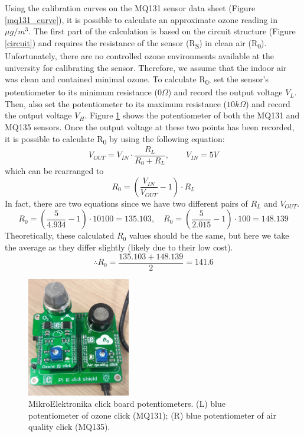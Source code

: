 \documentclass[11pt]{report}
\begin{document}
Using the calibration curves on the MQ131 sensor data sheet (Figure \ref{mq131_curve}), it is possible to calculate an approximate ozone reading in $\mu g/m^3$. The first part of the calculation is based on the circuit structure (Figure \ref{circuit}) and requires the resistance of the sensor (R\textsubscript{S}) in clean air (R\textsubscript{0}). Unfortunately, there are no controlled ozone environments available at the university for calibrating the sensor. Therefore, we assume that the indoor air was clean and contained minimal ozone. To calculate R\textsubscript{0}, set the sensor's potentiometer to its minimum resistance ($0\Omega$) and record the output voltage $V_L$. Then, also set the potentiometer to its maximum resistance ($10k\Omega$) and record the output voltage $V_H$. Figure \ref{potentiometer} shows the potentiometer of both the MQ131 and MQ135 sensors. Once the output voltage at these two points has been recorded, it is possible to calculate R\textsubscript{0} by using the following equation:
\begin{equation}
V_{OUT} = V_{IN} \cdot \frac{R_L}{R_0 + R_L}, \qquad V_{IN} = 5V
\end{equation}
which can be rearranged to
\begin{equation}
R_0 = (\frac{V_{IN}}{V_{OUT}} - 1) \cdot R_L
\end{equation}
In fact, there are two equations since we have two different pairs of $R_L$ and $V_{OUT}$.
\begin{equation}
R_0 = (\frac{5}{4.934} - 1) \cdot 10100 = 135.103 , \quad R_0 = (\frac{5}{2.015} - 1) \cdot 100 = 148.139
\end{equation}
Theoretically, these calculated $R_0$ values should be the same, but here we take the average as they differ slightly (likely due to their low cost).
\begin{equation}
\therefore R_0 = \frac{135.103 + 148.139}{2} = 141.6
\end{equation}

\begin{figure}[!tb]
\centering
\includegraphics[width=0.4\textwidth]{potentiometer}
\caption[MikroElektronika potentiometers]{MikroElektronika click board potentiometers. (L) blue potentiometer of ozone click (MQ131); (R) blue potentiometer of air quality click (MQ135).}
\label{potentiometer}
\end{figure}
\end{document}
